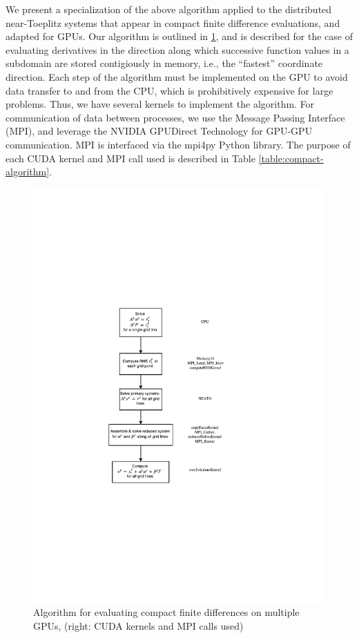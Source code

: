 \documentclass{elsarticle}
\begin{document}
We present a specialization of the above algorithm
applied to the distributed near-Toeplitz systems that
appear in compact finite difference evaluations,
and adapted for GPUs.
Our algorithm is outlined in \ref{fig:compact-algorithm},
and is described for the case of evaluating derivatives
in the direction along which successive
function values in a subdomain are stored contigiously in memory,
i.e., the ``fastest'' coordinate direction.
Each step of the algorithm must be implemented on the GPU
to avoid data transfer to and from the CPU,
which is prohibitively expensive for large problems.
Thus, we have several kernels to implement the algorithm.
For communication of data between processes,
we use the Message Passing Interface (MPI),
and leverage the NVIDIA GPUDirect Technology
for GPU-GPU communication.
MPI is interfaced via the mpi4py \cite{dalcin2005mpi}
Python library.
The purpose of each CUDA kernel and MPI call used
is described in Table \ref{table:compact-algorithm}.

\begin{figure}
\begin{center}
\includegraphics[trim={0 7cm 0 7cm},clip,width=500pt]{img/compact-algorithm.pdf}
\centering
\caption{Algorithm for evaluating compact finite differences on multiple GPUs,
(right: CUDA kernels and MPI calls used)}
\label{fig:compact-algorithm}
\end{center}
\end{figure}
\end{document}
